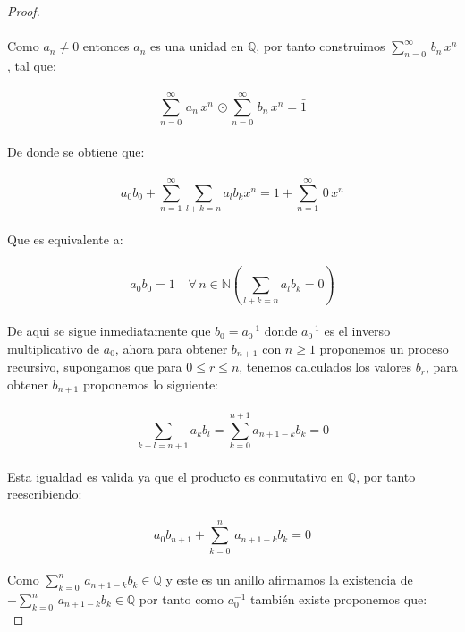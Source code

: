 \documentclass[11pt,letterpaper]{article}
\newcommand{\N}{\mathbb{N}}
\newcommand{\Q}{\mathbb{Q}}
\begin{document}
\begin{proof}\,\\
    \,\\
    Como $a_n\neq 0$ entonces $a_n$ es una unidad en $\Q$, por tanto construimos $\sum_{n=0}^{\infty}\,b_n\,x^n$, tal que:\,\\
    \,\\
    \begin{equation*}
        \sum_{n=0}^{\infty}\,a_n\,x^n\,\odot \sum_{n=0}^{\infty}\,b_n\,x^n=\bar{1}
    \end{equation*}\,\\
    De donde se obtiene que:\,\\
    \,\\
    \begin{equation*}
        a_0b_0+\sum_{n=1}^{\infty}\sum_{l+k=n}a_lb_k x^n=1+\sum_{n=1}^{\infty}\,0\,x^n
    \end{equation*}\,\\ 
    Que es equivalente a:\,\\
    \,\\
    \begin{equation*}
        a_0b_0=1\,\:\:\:\: \forall\,n\in \N \left(\sum_{l+k=n}a_lb_k=0\right)
    \end{equation*}\,\\
    De aqui se sigue inmediatamente que $b_0=a_0^{-1}$ donde $a_0^{-1}$ es el inverso multiplicativo de $a_0$, ahora para obtener 
    $b_{n+1}$ con $n\geq 1$ proponemos un proceso recursivo, supongamos que para $0\leq r\leq n$, tenemos calculados los valores $b_r$, para obtener $b_{n+1}$
    proponemos lo siguiente:\,\\
    \,\\
    \begin{equation*}
        \sum_{k+l=n+1}a_kb_l=\sum_{k=0}^{n+1}a_{n+1-k}b_k=0
    \end{equation*}\,\\
    Esta igualdad es valida ya que el producto es conmutativo en $\Q$, por tanto reescribiendo:\,\\
    \,\\
    \begin{equation*}
        a_0b_{n+1}+\sum_{k=0}^{n}\,a_{n+1-k}b_k=0
    \end{equation*}\,\\
    Como $\displaystyle\sum_{k=0}^{n}\,a_{n+1-k}b_k\in \Q$ y este es un anillo afirmamos la existencia de $\displaystyle-\sum_{k=0}^{n}\,a_{n+1-k}b_k\in \Q$
    por tanto como $a_0^{-1}$ tambi\'en existe proponemos que:\,\\

\end{proof}
\end{document}

